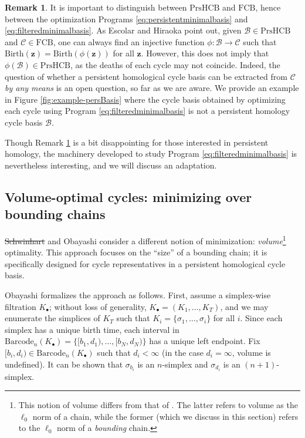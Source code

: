 \documentclass[utf8]{formatting_stuff/frontiersFPHY}
\newcommand{\cycle}{{\mathbf z}}
\newcommand{\fig}{Figure }
\newcommand{\birth}{\mathrm{Birth}}
\newcommand{\barcode}{\mathrm{Barcode}}
\newcommand{\fcyclebasis}{\mathcal{C}}
\newcommand{\setoffilteredcyclebases}{\mathrm{FCB}}
\newcommand{\setofpersistenthcyclebases}{\mathrm{PrsHCB}}
\newcommand{\pr}{Program }
\newcommand{\hcyclebasis}{\mathcal B}
\newcommand{\simplex}{\sigma}
\theoremstyle{plain}
\theoremstyle{definition}
\newtheorem{remark}[theorem]{Remark}
\providecommand{\DIFaddtex}[1]{{\protect\color{blue}\uwave{#1}}}
\providecommand{\DIFdeltex}[1]{{\protect\color{red}\sout{#1}}}
\providecommand{\DIFaddbegin}{} %
\providecommand{\DIFaddend}{} %
\providecommand{\DIFdelbegin}{} %
\providecommand{\DIFdelend}{} %
\providecommand{\DIFadd}[1]{\texorpdfstring{\DIFaddtex{#1}}{#1}} %
\providecommand{\DIFdel}[1]{\texorpdfstring{\DIFdeltex{#1}}{}} %
\begin{document}
\begin{remark}
\label{rmk:filteredversuspersistent}
It is important to distinguish between  $\setofpersistenthcyclebases$ and $\setoffilteredcyclebases$, hence between the optimization Programs \eqref{eq:persistentminimalbasis} and \eqref{eq:filteredminimalbasis}.  As Escolar and Hiraoka \cite{Escolar2016} point out, given $\hcyclebasis \in \setofpersistenthcyclebases$ and $\fcyclebasis \in \setoffilteredcyclebases$, one can always find an injective function $\phi: \hcyclebasis \to \fcyclebasis$ such that $\birth(\cycle) = \birth(\phi(\cycle))$ for all $\cycle$.  However, this does not imply that $\phi(\hcyclebasis) \in \setofpersistenthcyclebases$, as the deaths of each cycle may not coincide.  Indeed, the question of whether a persistent homological cycle basis can be extracted from $\fcyclebasis$ \emph{by any means} is an open question, so far as we are aware. We provide an example in \fig \ref{fig:example-persBasis} where the cycle basis obtained by optimizing each cycle using \pr \eqref{eq:filteredminimalbasis} is not a persistent homology cycle basis $\hcyclebasis$. 
\end{remark} 


Though Remark \ref{rmk:filteredversuspersistent} is a bit disappointing for those interested in persistent homology, the machinery developed to study \pr \eqref{eq:filteredminimalbasis} is nevertheless interesting, and we will discuss an adaptation.


\subsection{Volume-optimal cycles: minimizing over bounding chains}\label{sec:volume}

\DIFdelbegin \DIFdel{Schwinhart }\DIFdelend \DIFaddbegin \DIFadd{Schweinhart }\DIFaddend \cite{schweinhart2015statistical} and  Obayashi \cite{Obayashi2018} consider a different notion of minimization: \emph{volume}\footnote{This notion of volume differs from that of \cite{chenhardness}. The latter refers to volume as the $\ell_0$ norm of a chain, while the former (which we discuss in this section) refers to the $\ell_0$ norm of a \emph{bounding} chain.} optimality.  This approach focuses on the ``size'' of a bounding chain; it is specifically designed for cycle representatives in a persistent homological cycle basis.    


Obayashi \cite{Obayashi2018} formalizes the approach as follows.  First, assume a simplex-wise filtration $K_\bullet$; without loss of generality, $K_\bullet = (K_1, \ldots, K_T)$, and we may enumerate the simplices of $K_T$ such that $K_i = \{\simplex_1, \ldots, \simplex_i\}$ for all $i$.  Since each simplex has a unique birth time, each interval in  $\barcode_n(K_\bullet)= \{[b_1, d_1), \ldots, [b_N, d_N)\}$ has a unique left  endpoint.  Fix $[b_i,d_i) \in \barcode_n(K_\bullet)$ such that $d_i < \infty$ (in the case $d_i = \infty$, volume is undefined).    It can be shown that $\sigma_{b_i}$ is an $n$-simplex and  $\sigma_{d_i}$ is an $(n+1)$-simplex.
\end{document}
